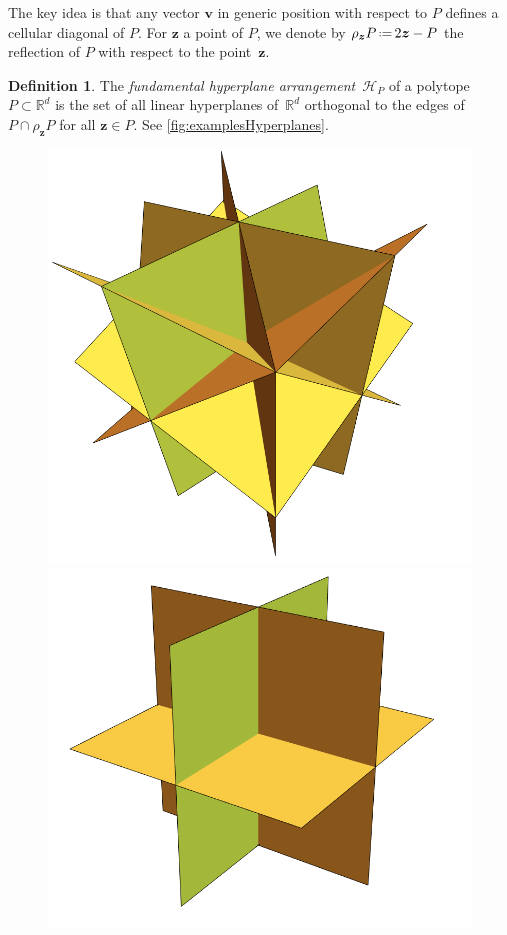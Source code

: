 \documentclass{amsart}
\newcommand{\darkblue}{\color{darkblue}} %
\theoremstyle{definition}
\newtheorem{definition}[theorem]{Definition}
\newcommand{\R}{\mathbb{R}} %
\renewcommand{\b}[1]{{\boldsymbol{#1}}} %
\newcommand{\eqdef}{\mbox{\,\raisebox{0.2ex}{\scriptsize\ensuremath{\mathrm:}}\ensuremath{=}\,}} %
\newcommand{\defn}[1]{\textsl{\darkblue #1}} %
\renewcommand{\b}[1]{\boldsymbol{#1}} %
\begin{document}
The key idea is that any vector $\b{v}$ in generic position with respect to $P$ defines a cellular diagonal of $P$.
For $\b{z}$ a point of $P$, we denote by $\rho_{\b{z}} P \eqdef 2\b{z}-P$ the reflection of $P$ with respect to the point~$\b{z}$.

\begin{definition}
	The \defn{fundamental hyperplane arrangement}~$\mathcal{H}_P$ of a polytope~$P \subset \R^d$ is the set of all linear hyperplanes of~$\R^d$ orthogonal to the edges of $P\cap \rho_{\b{z}} P$ for all $\b{z} \in P$. 
	See \cref{fig:examplesHyperplanes}.
\end{definition}

\begin{figure}[p]
	\centerline{
		\includegraphics[scale=.38]{HypSimplex.png} \hspace{-.6cm}
		\includegraphics[scale=.44]{HypCube.png} \hspace{-.3cm}
}
\end{figure}
\end{document}
